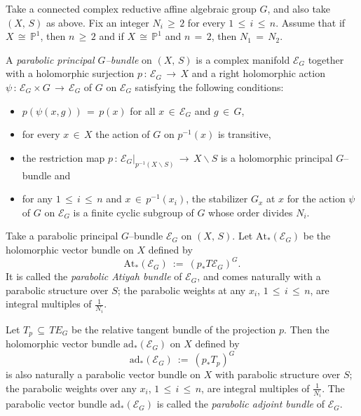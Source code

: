 \documentclass[12pt, reqno]{amsart}
\numberwithin{equation}{section}
\newcommand{\ad}{\textrm{ad}}
\newcommand{\At}{\textrm{At}}
\begin{document}
Take a connected complex reductive affine algebraic group $G$, and also take $(X,\,S)$ as above.
Fix an integer $N_{i}\,\geq\, 2$ for every $1\,\leq\, i\,\leq\, n$. Assume that if $X\,\cong\, \mathbb{P}^{1}$,
then $n\,\geq\, 2$ and if $X\,\cong\, \mathbb{P}^{1}$ and $n\,=\,2$, then $N_{1}\,=\,N_{2}$. 

A {\it parabolic principal $G$--bundle} on $(X,\,S)$ is a complex manifold $\mathcal{E}_{G}$ together with a
holomorphic surjection $p\,:\,\mathcal{E}_{G}\,\longrightarrow\, X$ and a right holomorphic
action $\psi\,:\,\mathcal{E}_{G}\times G\,\longrightarrow\,
 \mathcal{E}_{G}$ of $G$ on $\mathcal{E}_{G}$ satisfying the following conditions:
\begin{itemize}
\item $p(\psi(x,g))\,=\,p(x)$ for all $x\,\in\, \mathcal{E}_{G}$ and $g\,\in\, G$,

\item for every $x\,\in\, X$ the action of $G$ on $p^{-1}(x)$ is transitive,

\item the restriction map $p\,:\,{\mathcal{E}_{G}}\big\vert_{p^{-1}(X\backslash S)}\, \longrightarrow\,
 X\backslash S$ is a holomorphic principal $G$--bundle and
 
\item for any $1\,\leq\, i\,\leq\, n$ and $x\,\in\, p^{-1}(x_{i})$, the stabilizer $G_x$ at $x$ for the
action $\psi$ of $G$ on $\mathcal{E}_{G}$ is a finite cyclic subgroup of $G$ whose order divides $N_{i}$.
\end{itemize}

Take a parabolic principal $G$--bundle $\mathcal{E}_{G}$ on $(X,\,S)$. Let
$\At_{*}(\mathcal{E}_{G})$ be the holomorphic vector bundle on $X$ defined by
\[\At_{*}(\mathcal{E}_{G})\ :=\ (p_{*}T\mathcal{E}_{G})^{G}.\]
It is called the {\it parabolic Atiyah bundle} of $\mathcal{E}_{G}$, and comes 
naturally with a parabolic structure over $S$; the parabolic weights at any $x_i$, $1\, \leq\, i\,
\leq\, n$, are integral multiples of $\frac{1}{N_{i}}$.

Let $T_{p}\,\subseteq\, TE_{G}$ be the relative tangent bundle of the projection $p$. Then the holomorphic 
vector bundle $\ad_{*}(\mathcal{E}_{G})$ on $X$ defined by 
$$
\ad_{*}(\mathcal{E}_{G})\ :=\ (p_{*}T_{p})^{G}
$$
is also naturally a parabolic vector bundle on $X$ with parabolic structure over $S$;
the parabolic weights over any $x_i$, $1\, \leq\, i\,
\leq\, n$, are integral multiples of $\frac{1}{N_{i}}$. The parabolic vector bundle
$\ad_{*}(\mathcal{E}_{G})$ is called the {\it parabolic adjoint bundle} of $\mathcal{E}_{G}$.
\end{document}
